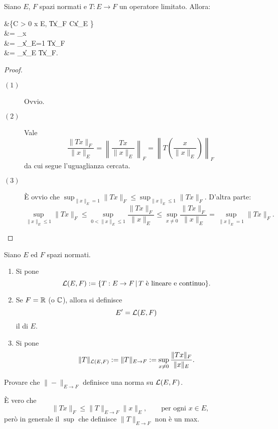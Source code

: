 \begin{lemma}
	Siano $E$, $F$ spazi normati e $T:E \to F$ un operatore limitato. Allora:
	\begin{eqalign*}
		&\inf\{C > 0 \suchthat \forall x \in E,\; \|Tx\|_F \leq C\|x\|_E \}\\&= \sup_{x } \\
		&= \sup_{\|x\|_E=1} \|Tx\|_F\\
		&= \sup_{\|x\|_E } \|Tx\|_F.
	\end{eqalign*}
\end{lemma}
\begin{proof}
	\leavevmode
	\begin{description}
		\item[$(1)$] Ovvio.
		\item[$(2)$] Vale
		$$
			\frac{\|Tx\|_F}{\|x\|_E} = \left\| \frac{Tx}{\|x\|_E} \right\|_F = \left\|T\left(\frac{x}{\|x\|_E}\right)\right\|_F
		$$
		da cui segue l'uguaglianza cercata.
		\item[$(3)$] È ovvio che $\sup_{\|x\|_E=1} \|Tx\|_F \leq \sup_{\|x\|_E \leq 1} \|Tx\|_F$. D'altra parte:
		$$
			\sup_{\|x\|_E \leq 1} \|Tx\|_F \leq \sup_{0 < \|x\|_E \leq 1} \frac{\|Tx\|_F}{\|x\|_E} \leq  \sup_{x \neq 0} \frac{\|Tx\|_F}{\|x\|_E} = \sup_{\|x\|_E = 1} \|Tx\|_F.
		$$
	\end{description}
\end{proof}

\begin{definition}
	Siano $E$ ed $F$ spazi normati.
	\begin{enumerate}
		\item Si pone
		$$
			\mathcal{L}(E, F) := \{ T:E \to F \,|\, \text{$T$ è lineare e continuo}\}.
		$$
		\item Se $F=\mathbb{R}$ (o $\mathbb{C}$), allora si definisce
		$$
			E' = \mathcal{L}(E, F)
		$$
		il  di $E$.
		\item Si pone
		$$
			\|T\|_{\mathcal{L}(E,F)} := \|T\|_{E \to F} := \sup_{x \neq 0} \frac{\|Tx\|_F}{\|x\|_E}.
		$$
	\end{enumerate}
\end{definition}

\begin{exercise}
	Provare che $\|-\|_{E \to F}$ definisce una norma su $\mathcal{L}(E,F)$.
\end{exercise}

\begin{remark}
	È vero che
	$$
		\|Tx\|_F \leq \|T\|_{E \to F} \|x\|_E, \qquad \text{per ogni $x \in E$},
	$$
	però in generale il $\sup$ che definisce $\|T\|_{E \to F}$ non è un max.
\end{remark}

